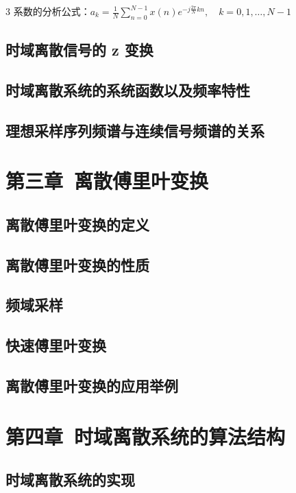 \documentclass[10pt, a4paper, landscape]{article}
\begin{document}
\begin{multicols*}{3}
系数的分析公式：$a_k = \frac{1}{N} \sum_{n=0}^{N-1} x(n) e^{-j\frac{2\pi}{N}kn}, \quad k = 0, 1, \dots, N-1$


\subsection{时域离散信号的 z 变换}

\subsection{时域离散系统的系统函数以及频率特性}

\subsection{理想采样序列频谱与连续信号频谱的关系}

\section{第三章\ 离散傅里叶变换}

\subsection{离散傅里叶变换的定义}

\subsection{离散傅里叶变换的性质}

\subsection{频域采样}

\subsection{快速傅里叶变换}

\subsection{离散傅里叶变换的应用举例}

\section{第四章\ 时域离散系统的算法结构}

\subsection{时域离散系统的实现}


\end{multicols*}
\end{document}
